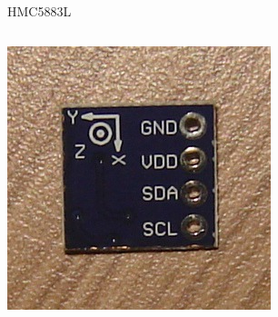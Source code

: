 \documentclass{beamer}
\begin{document}
\begin{frame}{HMC5883L}
\begin{columns}
		\includegraphics[width=1.0\textwidth]{../monografia/img/sensor_back.jpg}
	\end{columns}
\end{frame}
\end{document}

